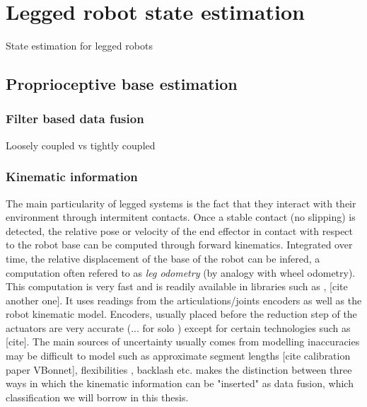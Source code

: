 \chapter{Legged robot state estimation}
State estimation for legged robots 


\section{Proprioceptive base estimation}
 

\subsection{Filter based data fusion}
Loosely coupled vs tightly coupled

\subsection{Kinematic information}
The main particularity of legged systems is the fact that they interact with their environment through intermitent contacts.
Once a stable contact (no slipping) is detected, the relative pose or velocity of the end effector in contact with respect to the robot base 
can be computed through forward kinematics. Integrated over time, the relative displacement of the base of the robot can be infered, a computation 
often refered to as \textit{leg odometry} (by analogy with wheel odometry). This computation is very fast and is readily available in libraries such as \cite{carpentier2019pinocchio}, [cite another one]. It uses
readings from the articulations/joints encoders as well as the robot kinematic model. Encoders, usually placed before the reduction step of the actuators
are very accurate (... for solo \cite{grimminger2020open}) except for certain technologies such as [cite]. The main sources of uncertainty usually comes from
modelling inaccuracies may be difficult to model such as approximate segment lengths [cite calibration paper VBonnet], flexibilities \cite{vigne2018estimation}, backlash \cite{fallon2014drift} etc. 
\cite{bloesch2018technical} makes the distinction between three ways in which the kinematic information can be "inserted" as data fusion, 
which classification we will borrow in this thesis. 


